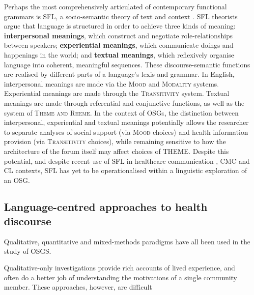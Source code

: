 \documentclass{article}
\renewcommand{\cite}{\parencite}
\begin{document}

Perhaps the most comprehensively articulated of contemporary functional grammars \cite{eggins_analysing_2004} is SFL, a socio-semantic theory of text and context \cite{halliday_introduction:_2004}. SFL theorists argue that language is structured in order to achieve three kinds of meaning: \textbf{interpersonal meanings}, which construct and negotiate role-relationships between speakers; \textbf{experiential meanings}, which communicate doings and happenings in the world; and \textbf{textual meanings}, which reflexively organise language into coherent, meaningful sequences. These discourse-semantic functions are realised by different parts of a language's lexis and grammar. In English, interpersonal meanings are made via the \textsc{Mood} and \textsc{Modality} systems. Experiential meanings are made through the \textsc{Transitivity} system. Textual meanings are made through referential and conjunctive functions, as well as the system of \textsc{Theme and Rheme}. In the context of OSGs, the distinction between interpersonal, experiential and textual meanings potentially allows the researcher to separate analyses of social support (via \textsc{Mood} choices) and health information provision (via \textsc{Transitivity} choices), while remaining sensitive to how the architecture of the forum itself may affect choices of THEME. Despite this potential, and despite recent use of SFL in healthcare communication \cite{matthiessen_applying_2013,slade_communicating_2015,woodward-kron_international_2016}, CMC \cite{lander_building_2014,zappavigna_enacting_2013} and CL \cite{hunston_systemic_2013,thompson_system_2014} contexts, SFL has yet to be operationalised within a linguistic exploration of an OSG.





%

\subsection{Language-centred approaches to health discourse}

Qualitative, quantitative and mixed-methods paradigms have all been used in the study of OSGS.

Qualitative-only investigations provide rich accounts of lived experience, and often do a better job of understanding the motivations of a single community member. These approaches, however, are difficult
\end{document}

